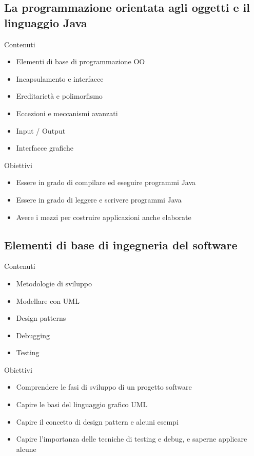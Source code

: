 \documentclass[presentation]{beamer} %
\begin{document}
\subsection{La programmazione orientata agli oggetti e il linguaggio Java}

\begin{frame}
	\begin{block}{Contenuti}
		\begin{itemize}
			\item Elementi di base di programmazione OO
			\item Incapsulamento e interfacce
			\item Ereditarietà e polimorfismo
			\item Eccezioni e meccanismi avanzati
			\item Input / Output
			\item Interfacce grafiche
		\end{itemize}
	\end{block}
	\begin{block}{Obiettivi}
		\begin{itemize}
			\item Essere in grado di compilare ed eseguire programmi Java
			\item Essere in grado di leggere e scrivere programmi Java
			\item Avere i mezzi per costruire applicazioni anche elaborate
		\end{itemize}
	\end{block}
\end{frame}

\subsection{Elementi di base di ingegneria del software}

\begin{frame}
	\begin{block}{Contenuti}
		\begin{itemize}
			\item Metodologie di sviluppo
			\item Modellare con UML
			\item Design patterns
			\item Debugging
			\item Testing
		\end{itemize}
	\end{block}
	\begin{block}{Obiettivi}
		\begin{itemize}
			\item Comprendere le fasi di sviluppo di un progetto software
			\item Capire le basi del linguaggio grafico UML
			\item Capire il concetto di design pattern e alcuni esempi
			\item Capire l'importanza delle tecniche di testing e debug, e saperne applicare alcune
		\end{itemize}
	\end{block}
\end{frame}
\end{document}
